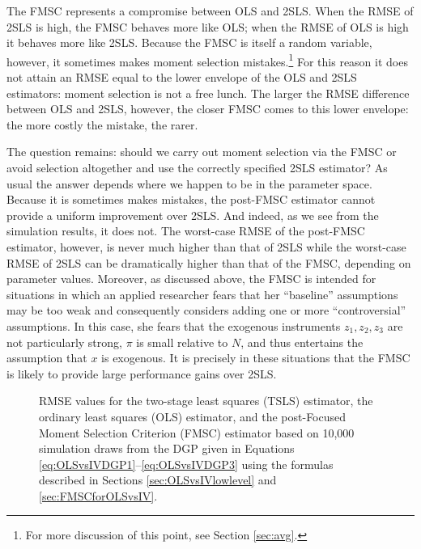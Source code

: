 The FMSC represents a compromise between OLS and 2SLS.
When the RMSE of 2SLS is high, the FMSC behaves more like OLS; when the RMSE of OLS is high it behaves more like 2SLS.
Because the FMSC is itself a random variable, however, it sometimes makes moment selection mistakes.\footnote{For more discussion of this point, see Section \ref{sec:avg}.} 
For this reason it does not attain an RMSE equal to the lower envelope of the OLS and 2SLS estimators: moment selection is not a free lunch.
The larger the RMSE difference between OLS and 2SLS, however, the closer FMSC comes to this lower envelope: the more costly the mistake, the rarer.

The question remains: should we carry out moment selection via the FMSC or avoid selection altogether and use the correctly specified 2SLS estimator?
As usual the answer depends where we happen to be in the parameter space.
Because it is sometimes makes mistakes, the post-FMSC estimator cannot provide a uniform improvement over 2SLS.
And indeed, as we see from the simulation results, it does not.
The worst-case RMSE of the post-FMSC estimator, however, is never much higher than that of 2SLS while the worst-case RMSE of 2SLS can be dramatically higher than that of the FMSC, depending on parameter values.
Moreover, as discussed above, the FMSC is intended for situations in which an applied researcher fears that her ``baseline'' assumptions may be too weak and consequently considers adding one or more ``controversial'' assumptions. 
In this case, she fears that the exogenous instruments $z_1, z_2, z_3$ are not particularly strong, $\pi$ is small relative to $N$, and thus entertains the assumption that $x$ is exogenous.
It is precisely in these situations that the FMSC is likely to provide large performance gains over 2SLS.

\begin{figure}
\centering
	
	\caption{RMSE values for the two-stage least squares (TSLS) estimator, the ordinary least squares (OLS) estimator, and the post-Focused Moment Selection Criterion (FMSC) estimator based on 10,000 simulation draws from the DGP given in Equations \ref{eq:OLSvsIVDGP1}--\ref{eq:OLSvsIVDGP3} using the formulas described in Sections \ref{sec:OLSvsIVlowlevel} and \ref{sec:FMSCforOLSvsIV}.}
	\label{fig:OLSvsIV_RMSEbaseline}
\end{figure}

